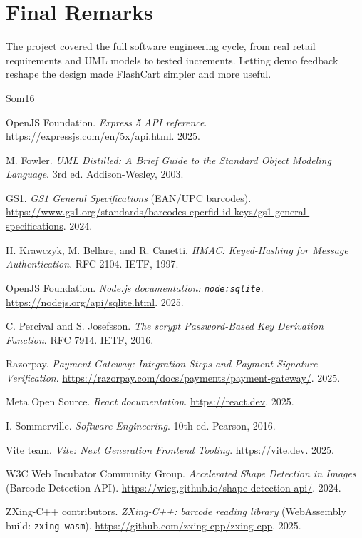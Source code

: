\documentclass[12pt,letterpaper,twoside,openany]{report}
\begin{document}
\section{Final Remarks}
The project covered the full software engineering cycle, from real retail requirements and UML
models to tested increments. Letting demo feedback reshape the design made FlashCart simpler
and more useful.

\begin{thebibliography}{Som16}
\raggedright

 OpenJS Foundation. \emph{Express 5 API reference}.
  \url{https://expressjs.com/en/5x/api.html}. 2025.

 M. Fowler. \emph{UML Distilled: A Brief Guide to the Standard
  Object Modeling Language}. 3rd ed. Addison-Wesley, 2003.

 GS1. \emph{GS1 General Specifications} (EAN/UPC barcodes).
  \url{https://www.gs1.org/standards/barcodes-epcrfid-id-keys/gs1-general-specifications}. 2024.

 H. Krawczyk, M. Bellare, and R. Canetti. \emph{HMAC: Keyed-Hashing
  for Message Authentication}. RFC 2104. IETF, 1997.

 OpenJS Foundation. \emph{Node.js documentation:
  \texttt{node:sqlite}}. \url{https://nodejs.org/api/sqlite.html}. 2025.

 C. Percival and S. Josefsson. \emph{The scrypt Password-Based Key
  Derivation Function}. RFC 7914. IETF, 2016.

 Razorpay. \emph{Payment Gateway: Integration Steps and Payment
  Signature Verification}. \url{https://razorpay.com/docs/payments/payment-gateway/}. 2025.

 Meta Open Source. \emph{React documentation}.
  \url{https://react.dev}. 2025.

 I. Sommerville. \emph{Software Engineering}. 10th ed.
  Pearson, 2016.

 Vite team. \emph{Vite: Next Generation Frontend Tooling}.
  \url{https://vite.dev}. 2025.

 W3C Web Incubator Community Group. \emph{Accelerated Shape
  Detection in Images} (Barcode Detection API).
  \url{https://wicg.github.io/shape-detection-api/}. 2024.

 ZXing-C++ contributors. \emph{ZXing-C++: barcode reading library}
  (WebAssembly build: \texttt{zxing-wasm}). \url{https://github.com/zxing-cpp/zxing-cpp}. 2025.

\end{thebibliography}
\end{document}
